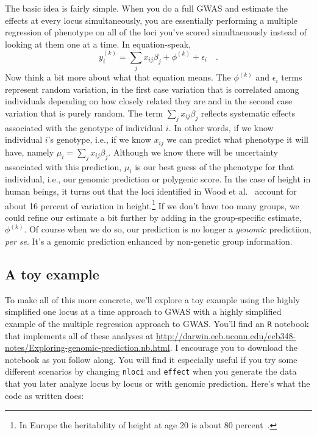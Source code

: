 \documentclass[12pt]{article}
\begin{document}
The basic idea is fairly simple. When you do a full GWAS and estimate
the effects at every locus simultaneously, you are essentially
performing a multiple regression of phenotype on all of the loci
you've scored simultaenously instead of looking at them one at a
time. In equation-speak,
\[
y_i^{(k)} = \sum_j x_{ij}\beta_j + \phi^{(k)} + \epsilon_i \quad .
\]
Now think a bit more about what that equation means. The $\phi^{(k)}$
and $\epsilon_i$ terms represent random variation, in the first case
variation that is correlated among individuals depending on how
closely related they are and in the second case variation that is
purely random. The term $\sum_j x_{ij}\beta_j$ reflects systematic
effects associated with the genotype of individual $i$. In other
words, if we know individual $i$'s genotype, i.e., if we know $x_{ij}$
we can predict what phenotype it will have, namely
$\mu_i = \sum_j x_{ij}\beta_j$. Although we know there will be
uncertainty associated with this prediction, $\mu_i$ is our best guess
of the phenotype for that individual, i.e., our genomic prediction or
polygenic score. In the case of height in human beings, it turns out
that the loci identified in Wood et al.~\cite{Wood-etal-2014} account
for about 16 percent of variation in height.\footnote{In Europe the
  heritability of height at age 20 is about 80
  percent~\cite{Jelenkovic-etal-2016}.}
 If we don't have too many groups, we could
refine our estimate a bit further by adding in the group-specific
estimate, $\phi^{(k)}$. Of course when we do so, our prediction is no
longer a {\it genomic\/} predictiion, {\it per se}. It's a genomic
prediction enhanced by non-genetic group information.

\subsection*{A toy example}

To make all of this more concrete, we'll explore a toy example using
the highly simplified one locus at a time approach to GWAS with a
highly simplified example of the multiple regression approach to
GWAS. You'll find an {\tt R} notebook that implements all of these
analyses at
\url{http://darwin.eeb.uconn.edu/eeb348-notes/Exploring-genomic-prediction.nb.html}. I
encourage you to download the notebook as you follow along. You will
find it especially useful if you try some different scenarios by
changing {\tt nloci} and {\tt effect} when you generate the data that
you later analyze locus by locus or with genomic prediction. Here's
what the code as written does:
\end{document}
